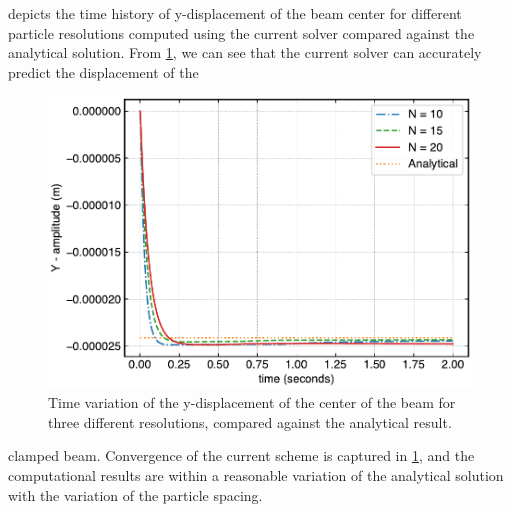 \documentclass[10pt, conference]{FMFP2022}
\begin{document}
 depicts the time history of y-displacement of the beam
center for different particle resolutions computed using the current solver
compared against the analytical solution. From \cref{fig:udl-disp-plot}, we can
see that the current solver can accurately predict the displacement of the
\begin{figure}
  \centering
  \includegraphics[scale=0.5]{figures/khayyer_2021_udl/homogenous}
  \caption{Time variation of the y-displacement of the center of the beam for
    three different resolutions, compared against the analytical result.}
\label{fig:udl-disp-plot}
\end{figure}
clamped beam. Convergence of the current scheme is captured in
\cref{fig:udl-disp-plot}, and the computational results are within a reasonable
variation of the analytical solution with the variation of the particle spacing.
\end{document}
